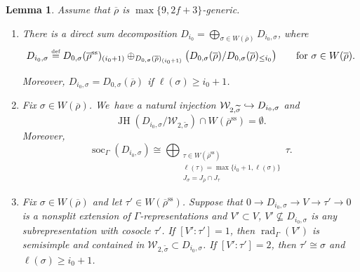 \documentclass[JEP,XML,SOM,Unicode,NoFloatCountersInSection, NoEqCountersInSection,published]{cedram}
\newcommand\hto{\mathrel{\lhook\joinrel\to}}
\let\wt\widetilde
\newcommand{\defeq}{\stackrel{\textrm{\tiny{\upshape{def}}}}{=}}
\renewcommand{\ss}{\mathrm{ss}}
\newcommand{\brho}{\overline{\rho}}
\DeclareMathOperator{\JH}{\mathrm{JH}}
\DeclareMathOperator{\rad}{rad}
\DeclareMathOperator{\soc}{soc}
\theoremstyle{plain}
\newtheorem{lem}[prop]{Lemma}
\theoremstyle{definition}
\begin{document}
\pagebreak[2]
\begin{lem}\label{lem:D=A+B}
Assume that $\brho$ is $\max\{9,2f+3\}$-generic.
\begin{enumerate}
\item
\label{it:D=A+B:1}
There is a direct sum decomposition $D_{i_0}=\bigoplus_{\sigma \in W(\brho)} D_{i_0,\sigma}$, where\vspace*{-3pt}
\[
D_{i_0,\sigma} \defeq D_{0,\sigma}(\brho^\ss)_{(i_0+1)} \oplus_{D_{0,\sigma}(\brho)_{(i_0+1)}} \bigl(D_{0,\sigma}(\brho)/D_{0,\sigma}(\brho)_{\le i_0}\bigr) \qquad\text{for $\sigma \in W(\brho)$}.
\]

Moreover,
$D_{i_0,\sigma} = D_{0,\sigma}(\brho)$ if $\ell(\sigma) \ge i_0+1$.

\item\label{it:D=A+B:2}
Fix $\sigma \in W(\brho)$. We~have a natural injection $\mathcal{W}_{2,\wt\sigma} \hto D_{i_0,\sigma}$ and\vspace*{-3pt}
\[
\JH(D_{i_0,\sigma}/\mathcal{W}_{2,\wt\sigma}) \cap W(\brho^\ss) = \emptyset.
\]
Moreover,\vspace*{-3pt}
\begin{equation}\label{eq:soc-D-i0-sigma}
\soc_{\Gamma}(D_{i_0,\sigma}) \cong \bigoplus_{\substack{\tau \in W(\brho^\ss)\\\ell(\tau)=\max\{i_0+1,\ell(\sigma)\}\\J_\sigma = J_{\brho} \cap J_\tau}} \tau.
\end{equation}

\item\label{it:D=A+B:3}
Fix $\sigma \in W(\brho)$ and let $\tau'\in W(\brho^\ss)$. Suppose that $0 \to D_{i_0,\sigma} \to V \to \tau' \to 0$ is a nonsplit extension of $\Gamma$-representations and $V'\subset V$, $V'\nsubseteq D_{i_0,\sigma}$ is any subrepresentation with cosocle $\tau'$.
If $[V':\tau'] = 1$, then $\rad_{\Gamma}(V')$ is semisimple and contained in $\mathcal{W}_{2,\wt\sigma} \subset D_{i_0,\sigma}$.
If $[V':\tau'] = 2$, then $\tau' \cong \sigma$ and $\ell(\sigma) \ge i_0+1$.
\end{enumerate}
\end{lem}
\end{document}
